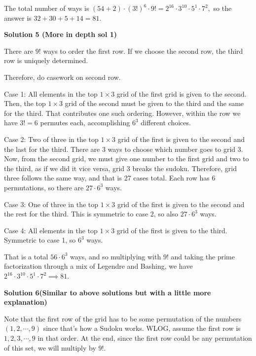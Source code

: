 \begin{enumerate}
 The total number of ways is $(54 + 2) \cdot (3!)^6 \cdot 9! = 2^{16} \cdot 3^{10} \cdot 5^1 \cdot 7^2,$ so the answer is $32 + 30 + 5 + 14 = \boxed{81}.$




\textbf{Solution 5 (More in depth sol 1)}

There are $9!$ ways to order the first row. If we choose the second row, the third row is uniquely determined.

 Therefore, do casework on second row.

 Case 1: All elements in the top $1 \times 3$ grid of the first grid is given to the second. Then, the top $1 \times 3$ grid of the second must be given to the third and the same for the third. That contributes one such ordering. However, within the row we have $3! = 6$ permutes each, accomplishing $6^3$ different choices.

 Case 2: Two of three in the top $1 \times 3$ grid of the first is given to the second and the last for the third. There are 3 ways to choose which number goes to grid 3. Now, from the second grid, we must give one number to the first grid and two to the third, as if we did it vice versa, grid 3 breaks the sudoku. Therefore, grid three follows the same way, and that is 27 cases total. Each row has 6 permutations, so there are $27 \cdot 6^3$ ways.

 Case 3: One of three in the top $1 \times 3$ grid of the first is given to the second and the rest for the third. This is symmetric to case 2, so also $27 \cdot 6^3$ ways.

 Case 4: All elements in the top $1 \times 3$ grid of the first is given to the third. Symmetric to case 1, so $6^3$ ways.

 That is a total $56 \cdot 6^3$ ways, and so multiplying with $9!$ and taking the prime factorization through a mix of Legendre and Bashing, we have $2^{16} \cdot 3^{10} \cdot 5^1 \cdot 7^2 \implies \boxed{81}$.

 



\textbf{Solution 6(Similar to above solutions but with a little more explanation)}

Note that the first row of the grid has to be some permutation of the numbers $(1, 2, \cdots, 9)$ since that's how a Sudoku works. WLOG, assume the first row is $1, 2, 3, \cdots, 9$ in that order. At the end, since the first row could be any permutation of this set, we will multiply by $9!$. 


\end{enumerate}
